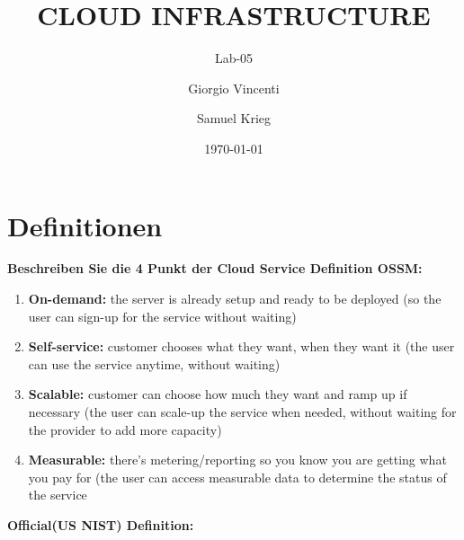 \documentclass[a4,12pt]{scrartcl}
\title{CLOUD INFRASTRUCTURE}
\subtitle{Lab-05}
\author{Giorgio Vincenti \and Samuel Krieg}
\date{\today}
\begin{document}
\clearpage\maketitle
\thispagestyle{empty}
\tableofcontents
\newpage

\section{Definitionen}
\textbf{Beschreiben Sie die 4 Punkt der Cloud Service Definition OSSM:}
\begin{enumerate}
  \item \textbf{On-demand:} the server is already setup and ready to be deployed (so the user can sign-up for the service without waiting)
  \item \textbf{Self-service:} customer chooses what they want, when they want it (the user can use the service anytime, without waiting)
  \item \textbf{Scalable:} customer can choose how much they want and ramp up if necessary (the user can scale-up the service when needed, without waiting for the provider to add more capacity) 
  \item \textbf{Measurable:} there’s metering/reporting so you know you are getting what you pay for (the user can access measurable data to determine the status of the service

\end{enumerate}
\textbf{Official(US NIST) Definition:}
\end{document}
